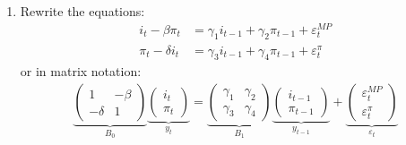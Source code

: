 \begin{enumerate}

\item Rewrite the equations:
\begin{align*}
i_t - \beta \pi_t  &=  \gamma_1 i_{t-1} + \gamma_2 \pi_{t-1} + \varepsilon_t^{MP}\\
\pi_t - \delta i_t &=  \gamma_3 i_{t-1} + \gamma_4 \pi_{t-1} + \varepsilon_t^{\pi}
\end{align*}
or in matrix notation:
\begin{align*}
\underbrace{\begin{pmatrix}	1 & -\beta \\ -\delta & 1 \end{pmatrix}}_{B_0} \underbrace{\begin{pmatrix} i_t \\ \pi_t \end{pmatrix}}_{y_t} = \underbrace{\begin{pmatrix} \gamma_1 & \gamma_2 \\ \gamma_3 & \gamma_4 \end{pmatrix}}_{B_1} \underbrace{\begin{pmatrix} i_{t-1} \\ \pi_{t-1} \end{pmatrix}}_{y_{t-1}} + \underbrace{\begin{pmatrix} \varepsilon_t^{MP} \\ \varepsilon_t^{\pi} \end{pmatrix}}_{\varepsilon_t}
\end{align*}


\end{enumerate}
